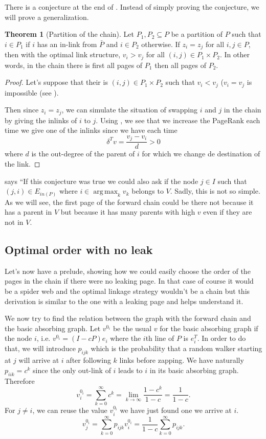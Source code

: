 \documentclass{article}
\DeclareMathOperator*{\argmax}{arg\,max}
\newcommand{\1}{\mathbf{1}}
\theoremstyle{definition}
\newtheorem{mytheo}[mydef]{Theorem}
\begin{document}
There is a conjecture at the end of \cite{de2008maximizing}.
Instead of simply proving the conjecture, we will prove a generalization.
\begin{mytheo}[Partition of the chain]
  \label{theo:partition}
  Let $P_1,P_2 \subseteq P$ be a partition of $P$ such that
  $i \in P_1$ if $i$ has an in-link from $\bar{P}$ and $i \in P_2$
  otherwise.
  If $z_i = z_j$ for all $i,j \in P$,
  then with the optimal link structure,
  $v_i > v_j$ for all $(i,j) \in P_1 \times P_2$.
  In other words, in the chain there is first all pages of
  $P_1$ then all pages of $P_2$.
  \begin{proof}
    Let's suppose that their is $(i,j) \in P_1 \times P_2$
    such that $v_i < v_j$ ($v_i = v_j$ is impossible (see \cite[theorem~12]{de2008maximizing}).

    Then since $z_i = z_j$, we can simulate the situation of swapping $i$ and $j$ in the chain
    by giving the inlinks of $i$ to $j$.
    Using \cite[theorem~5]{de2008maximizing}, we see that we increase the PageRank each time we give one of the inlinks since
    we have each time
    \[ \delta^Tv = \frac{v_j - v_i}{d} > 0 \]
    where $d$ is the out-degree of the parent of $i$ for which we change de destination of the link.
  \end{proof}
\end{mytheo}

\cite{de2008maximizing} says
``If this conjecture was true we could also ask if the node $j \in I$ such that
$(j, i) \in E_{in(P)}$ where $i \in \argmax_k v_k$ belongs to $V$.
Sadly, this is not so simple. 
As we will see, the first page of the forward chain could be there not
because it has a parent in $V$ but because it has many parents with high $v$ even if they are not in $V$.

\subsection{Optimal order with no leak}
\label{sec:no_leak}
Let's now have a prelude, showing how we could easily choose the order of the pages in the chain if there were
no leaking page.
In that case of course it would be a spider web and the optimal linkage strategy wouldn't be a chain but this derivation is similar
to the one with a leaking page and helps understand it.

We now try to find the relation between the graph with the forward chain and the basic absorbing graph.
Let $v^{0_i}$ be the usual $v$ for the basic absorbing graph if the node $i$,
i.e. $v^{0_i} = (I - cP)e_i$ where the $i$th line of $P$ is $e_i^T$.
In order to do that, we will introduce $p_{ijk}$ which is the probability that a random walker starting at $j$
will arrive at $i$ after following $k$ links before zapping.
We have naturally $p_{iik} = c^k$ since the only out-link of $i$ leads to $i$ in its basic absorbing graph.
Therefore
\[ v_i^{0_i} = \sum_{k=0}^\infty c^k = \lim_{k \to \infty} \frac{1-c^k}{1-c} = \frac{1}{1-c}. \]
For $j \neq i$, we can reuse the value $v_i^{0_i}$ we have just found one we arrive at $i$.
\[ v_j^{0_i} = \sum_{k=0}^\infty p_{ijk} v_i^{0_i} = \frac{1}{1-c} \sum_{k=0}^\infty p_{ijk}. \]
\end{document}
